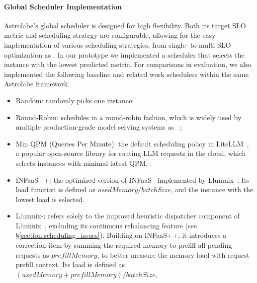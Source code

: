 \documentclass[sigconf, review, anonymous]{acmart}
\begin{document}



\paragraph{Global Scheduler Implementation} \label{section:baselinescheduler}
Astrolabe's global scheduler is designed for high flexibility. Both its target SLO metric and scheduling strategy are configurable, allowing for the easy implementation of various scheduling strategies, from single- to multi-SLO optimization as \cite{chen2025slosserveoptimizedservingmultislo}. In our prototype we implemented a scheduler that selects the instance with the lowest predicted metric. For comparisons in evaluation, we also implemented the following baseline and related work schedulers within the same Astrolabe framework.
\begin{itemize}
    \item Random: randomly picks one instance;
    \item Round-Robin: schedules in a round-robin fashion, which is widely used by multiple production-grade model serving systems as ~\cite{nvidiaTritonInference, rayServeScalable};
    \item Min QPM (Queries Per Minute): the default scheduling policy in LiteLLM~\cite{litellm}, a popular open-source library for routing LLM requests in the cloud, which selects instances with minimal latest QPM.
    \item INFaaS++: the optimized version of INFaaS~\cite{infaas} implemented by Llumnix~\cite{sun2024llumnix}. Its load function is defined as $usedMemory / batchSize$, and the instance with the lowest load is selected.
    \item Llumnix-: refers solely to the improved heuristic dispatcher component of Llumnix~\cite{sun2024llumnix}, excluding its continuous rebalancing feature (see \S\ref{section:scheduling_issues}). Building on INFaaS++, it introduces a correction item by summing the required memory to prefill all pending requests as $prefillMemory$, to better measure the memory load with request prefill context. Its load is defined as $(usedMemory + prefillMemory)/ batchSize$. 
\end{itemize}
\end{document}
